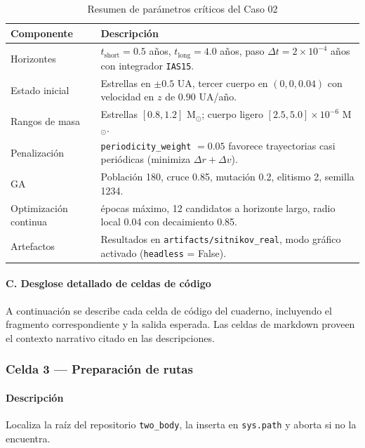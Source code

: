 \begin{table}[H]
\centering
\caption{Resumen de parámetros críticos del Caso 02}
\label{tab:c02_params} %
\begin{tabularx}{\textwidth}{@{}l>{\raggedright\arraybackslash}X@{}}
\toprule
\textbf{Componente} & \textbf{Descripción} \\
\midrule
Horizontes & $t_{\text{short}} = 0.5$ años, $t_{\text{long}} = 4.0$ años, paso $\Delta t = 2\times10^{-4}$ años con integrador \texttt{IAS15}. \\
Estado inicial & Estrellas en $\pm0.5$ UA, tercer cuerpo en $(0,0,0.04)$ con velocidad en $z$ de $0.90$ UA/año. \\
Rangos de masa & Estrellas $[0.8,1.2]$ M$_\odot$; cuerpo ligero $[2.5,5.0]\times10^{-6}$ M$_\odot$. \\
Penalización & \texttt{periodicity\_weight} $=0.05$ favorece trayectorias casi periódicas (minimiza $\Delta r + \Delta v$). \\
GA & Población 180, cruce 0.85, mutación 0.2, elitismo 2, semilla 1234. \\
Optimización continua & 50 épocas máximo, 12 candidatos a horizonte largo, radio local 0.04 con decaimiento 0.85. \\
Artefactos & Resultados en \texttt{artifacts/sitnikov\_real}, modo gráfico activado (\texttt{headless} = False). \\
\bottomrule
\end{tabularx}
\end{table}

\paragraph{C. Desglose detallado de celdas de código}
A continuación se describe cada celda de código del cuaderno, incluyendo el fragmento correspondiente y la salida esperada. Las celdas de markdown proveen el contexto narrativo citado en las descripciones.

\subsubsection*{Celda 3 — Preparación de rutas}
\paragraph{Descripción} Localiza la raíz del repositorio \texttt{two\_body}, la inserta en \texttt{sys.path} y aborta si no la encuentra.
